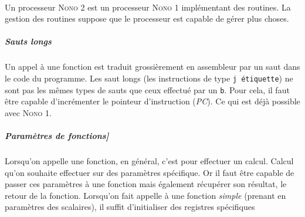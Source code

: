\paragraph{}{
	Un processeur \textsc{Nono 2} est un processeur \textsc{Nono 1}
	implémentant des routines. La gestion des routines suppose que
	le processeur est capable de gérer plus choses.	
}

	\subparagraph{Sauts longs}{
	Un appel à une fonction est traduit grossièrement en assembleur par 
	un saut dans le code du programme.
	Les saut longs (les instructions de type \verb|j étiquette|)
	ne sont pas les mêmes types de sauts que ceux effectué par un \verb|b|.
	Pour cela, il faut être capable d'incrémenter le pointeur d'instruction
	(\textit{PC}). Ce qui est déjà possible avec \textsc{Nono 1}.
	}
	
	\subparagraph{Paramètres de fonctions]}{
	Lorsqu'on appelle une fonction, en général, c'est pour effectuer un calcul. 
	Calcul qu'on souhaite effectuer sur des paramètres spécifique. Or il faut 
	être capable de passer ces paramètres à une fonction mais également récupérer
	son résultat, le retour de la fonction. Lorsqu'on fait appelle à une fonction
	\textit{simple} (prenant en paramètres des scalaires), il suffit d'initialiser
	des registres spécifiques 
	}